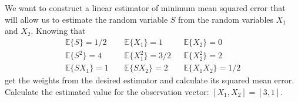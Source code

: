 \begin{exercise}
We want to construct a linear estimator of minimum mean squared error that will allow us to estimate the random variable $S$ from the random variables $X_1$ and $X_2$. Knowing that
\begin{equation}
\begin{array}{lll} \mathbb{E}\{S\} = 1/2 & \mathbb{E}\{X_1\} = 1 & \mathbb{E}\{X_2\} = 0 \\ \mathbb{E}\{S^2\} = 4 & \mathbb{E}\{X_1^2\} = 3/2 & \mathbb{E}\{X_2^2\} = 2 \\ \mathbb{E}\{S X_1\} = 1 \;\;\;\;& \mathbb{E}\{S X_2\} = 2 \;\;\;\; & \mathbb{E}\{X_1 X_2\} = 1/2 \end{array}\nonumber
\end{equation}
get the weights from the desired estimator and calculate its squared mean error. Calculate the estimated value for the observation vector: $[X_1,X_2] = [3, 1]$.
\end{exercise}
